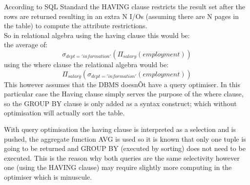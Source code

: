 According to SQL Standard the HAVING clause restricts the result set after the rows are returned resulting in an extra N I/Os (assuming there are N pages in the table) to compute the attribute restrictions. 
\\

So in relational algebra using the having clause this would be:
\\the average of:
$$\sigma_{dept='information'}(\Pi_{salary}(employment))$$
using the where clause the relational algebra would be:
$$\Pi_{salary}(\sigma_{dept='information'}(employment))$$
This however assumes that the DBMS doesnÕt have a query optimiser. In this particular case the Having clause simply serves the purpose of the where clause, so the GROUP BY clause is only added as a syntax construct; which without optimisation will actually sort the table. 

With query optimisation the having clause is interpreted as a selection and is pushed, the aggregate function AVG is used so it is known that only one tuple is going to be returned and GROUP BY (executed by sorting) does not need to be executed.
This is the reason why both queries are the same selectivity however one (using the HAVING clause) may require slightly more computing in the optimiser which is minuscule.


